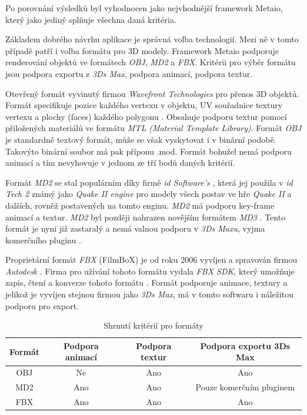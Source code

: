 \documentclass[twoside,12pt]{article}
\begin{document}
Po porovnání výsledků byl vyhodnocen jako nejvhodnější framework Metaio, který jako jediný splňuje všechna daná kritéria.

Základem dobrého návrhu aplikace je správná volba technologií. Mezi ně v tomto případě patří i volba formátu pro 3D modely. Framework Metaio podporuje renderování objektů ve formátech \textit{OBJ}, \textit{MD2} a \textit{FBX}. 
Kritérii pro výběr formátu jsou podpora exportu z \textit{3Ds Max}, podpora animací, podpora textur.

Otevřený formát vyvinutý firmou \textit{Wavefront Technologies} pro přenos 3D objektů. Formát specifikuje pozice každého vertexu v objektu, UV souřadnice textury vertexu a plochy (faces) každého polygonu \cite{obj_wiki}. Obsahuje podporu textur pomocí přiložených materiálů ve formátu \textit{MTL (Material Template Library)}. Formát \textit{OBJ} je standardně textový formát, může se však vyskytovat i v binární podobě. Takovýto binární soubor má pak příponu .mod. Formát bohužel nemá podporu animací \cite{obj_doc} a tím nevyhovuje v jednom ze tří bodů daných kritérií.

Formát \textit{MD2} se stal populárním díky firmě \textit{id Software's} \cite{md2_wiki}, která jej použila v \textit{id Tech 2} známý jako \textit{Quake II engine} \cite{quake_engine} pro modely všech postav ve hře \textit{Quake II} a dalších, rovněž postavených na tomto enginu. \textit{MD2} má podporu key-frame animací a textur. \textit{MD2} byl později nahrazen novějším formátem \textit{MD3} \cite{id_tech_3_wiki}. Tento formát je nyní již zastaralý a nemá valnou podporu v \textit{3Ds Maxu}, vyjma komerčního pluginu \cite{qtip_plugin}. 

Proprietární formát \textit{FBX} (FilmBoX) je od roku 2006 vyvíjen a spravován firmou \textit{Autodesk} \cite{autodesk_fbx}. Firma pro užívání tohoto formátu vydala \textit{FBX SDK}, který umožňuje zapis, čtení a konverze tohoto formátu \cite{autodesk_fbx_sdk}. Formát podporuje animace, textury a jelikož je vyvíjen stejnou firmou jako \textit{3Ds Max}, má v tomto softwaru i náležitou podporu pro export.


\begin{table}[H]
\centering
\begin{tabular}{|c|c|c|c|}
\hline
Formát & Podpora animací & Podpora textur & Podpora exportu 3Ds Max  \\ \hline
OBJ    & Ne              & Ano            & Ano                      \\ \hline
MD2    & Ano             & Ano            & Pouze komerčním pluginem \\ \hline
FBX    & Ano             & Ano            & Ano                      \\ \hline
\end{tabular}
\caption{Shrnutí kritérií pro formáty}
\end{table}
\end{document}
